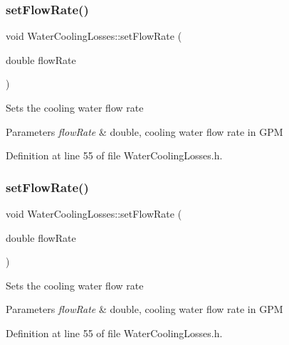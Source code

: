 \subsubsection{\texorpdfstring{set\+Flow\+Rate()}{setFlowRate()}\hspace{0.1cm}{\footnotesize\ttfamily [2/3]}}
{\footnotesize\ttfamily void Water\+Cooling\+Losses\+::set\+Flow\+Rate (\begin{DoxyParamCaption}\item[{double}]{flow\+Rate }\end{DoxyParamCaption})\hspace{0.3cm}{\ttfamily [inline]}}

Sets the cooling water flow rate 
\begin{DoxyParams}{Parameters}
{\em flow\+Rate} & double, cooling water flow rate in G\+PM \\
\hline
\end{DoxyParams}


Definition at line 55 of file Water\+Cooling\+Losses.\+h.

\mbox{\label{class_water_cooling_losses_abf4d64d9261818af331613791374d42f}} 
\subsubsection{\texorpdfstring{set\+Flow\+Rate()}{setFlowRate()}\hspace{0.1cm}{\footnotesize\ttfamily [3/3]}}
{\footnotesize\ttfamily void Water\+Cooling\+Losses\+::set\+Flow\+Rate (\begin{DoxyParamCaption}\item[{double}]{flow\+Rate }\end{DoxyParamCaption})\hspace{0.3cm}{\ttfamily [inline]}}

Sets the cooling water flow rate 
\begin{DoxyParams}{Parameters}
{\em flow\+Rate} & double, cooling water flow rate in G\+PM \\
\hline
\end{DoxyParams}


Definition at line 55 of file Water\+Cooling\+Losses.\+h.

\mbox{\label{class_water_cooling_losses_a56b0b64b71ecbece780622d5f4b536ba}} 
